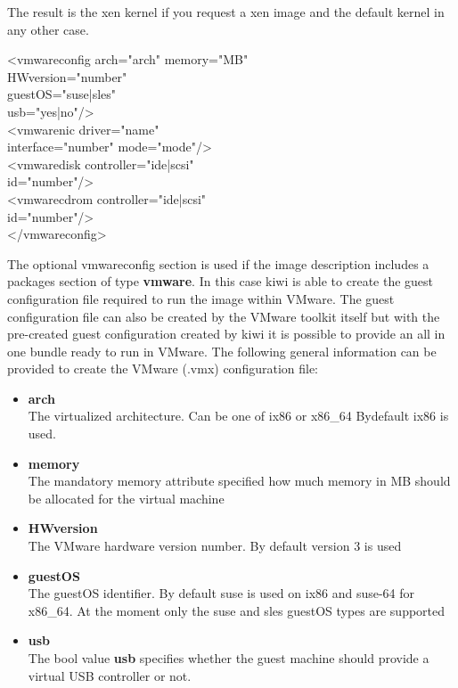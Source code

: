 The result is the xen kernel if you request a xen
image and the default kernel in any other case.

\begin{Command}{12cm}
<vmwareconfig arch="arch" memory="MB"\\
\hspace*{2.5cm}HWversion="number"\\
\hspace*{2.5cm}guestOS="suse|sles"\\
\hspace*{2.5cm}usb="yes|no"/>\\
\hspace*{1cm}<vmwarenic driver="name"\\
\hspace*{2.5cm}interface="number" mode="mode"/>\\
\hspace*{1cm}<vmwaredisk controller="ide|scsi"\\
\hspace*{2.5cm}id="number"/>\\
\hspace*{1cm}<vmwarecdrom controller="ide|scsi"\\
\hspace*{2.5cm}id="number"/>\\
</vmwareconfig>
\end{Command}

The optional vmwareconfig section is used if the image description
includes a packages section of type \textbf{vmware}. In this case kiwi
is able to create the guest configuration file required to run the
image within VMware. The guest configuration file can also be created
by the VMware toolkit itself but with the pre-created guest configuration
created by kiwi it is possible to provide an all in one bundle ready
to run in VMware. The following general information can be provided to
create the VMware (.vmx) configuration file:

\begin{itemize}
\item \textbf{arch}\\
      The virtualized architecture. Can be one of ix86 or x86\_64
      Bydefault ix86 is used.
\item \textbf{memory}\\
      The mandatory memory attribute specified how much memory in MB
      should be allocated for the virtual machine
\item \textbf{HWversion}\\
      The VMware hardware version number. By default version 3 is used
\item \textbf{guestOS}\\
      The guestOS identifier. By default suse is used on ix86 and suse-64
      for x86\_64. At the moment only the suse and sles guestOS types
      are supported
\item \textbf{usb}\\
      The bool value \textbf{usb} specifies whether the guest machine
      should provide a virtual USB controller or not.
\end{itemize}

